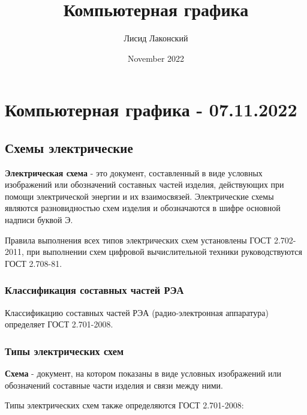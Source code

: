 \documentclass{article}
\title{Компьютерная графика}
\author{Лисид Лаконский}
\date{November 2022}
\begin{document}
\maketitle
\tableofcontents
\pagebreak

\section{Компьютерная графика - 07.11.2022}

\subsection{Схемы электрические}

\begin{flushleft}

\textbf{Электрическая схема} - это документ, составленный в виде условных изображений или обозначений составных частей изделия, действующих при помощи электрической энергии и их взаимосвязей. Электрические схемы являются разновидностью схем изделия и обозначаются в шифре основной надписи буквой Э.

Правила выполнения всех типов электрических схем установлены ГОСТ 2.702-2011, при выполнении схем цифровой вычислительной техники руководствуются ГОСТ 2.708-81.

\subsubsection{Классификация составных частей РЭА}

Классификацию составных частей РЭА (радио-электронная аппаратура) определяет ГОСТ 2.701-2008.

\subsubsection{Типы электрических схем}

\textbf{Схема} - документ, на котором показаны в виде условных изображений или обозначений составные части изделия и связи между ними.

\hfill

Типы электрических схем также определяются ГОСТ 2.701-2008:

\begin{multienumerate}
\end{multienumerate}


\end{flushleft}
\end{document}
